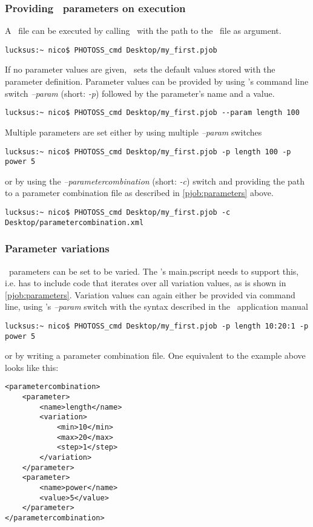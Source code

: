 \subsubsection{Providing \PJOB\ parameters on execution}
A \PJOB\ file can be executed by calling \PHO\ with the path to the \PJOB\ file as argument.
\begin{lstlisting}
lucksus:~ nico$ PHOTOSS_cmd Desktop/my_first.pjob
\end{lstlisting}
If no parameter values are given, \PHO\ sets the default values stored with the parameter definition.
Parameter values can be provided by using \PHO's command line switch \textit{--param} (short: \textit{-p})
followed by the parameter's name and a value.
\begin{lstlisting}
lucksus:~ nico$ PHOTOSS_cmd Desktop/my_first.pjob --param length 100
\end{lstlisting}
Multiple parameters are set either by using multiple \textit{--param} switches
\begin{lstlisting}
lucksus:~ nico$ PHOTOSS_cmd Desktop/my_first.pjob -p length 100 -p power 5
\end{lstlisting}
or by using the \textit{--parametercombination} (short: \textit{-c}) switch and providing the path to a parameter combination file
as described in \ref{pjob:parameters} above.
\begin{lstlisting}
lucksus:~ nico$ PHOTOSS_cmd Desktop/my_first.pjob -c Desktop/parametercombination.xml
\end{lstlisting}

\subsubsection{Parameter variations}
\PJOB\ parameters can be set to be varied.
The \PJOB's main.pscript needs to support this, i.e. has to include code that iterates over all variation values, as is shown in \ref{pjob:parameters}.
Variation values can again either be provided via command line, using \PHO's \textit{--param} switch with the syntax described in the \PHO\ application manual
\begin{lstlisting}
lucksus:~ nico$ PHOTOSS_cmd Desktop/my_first.pjob -p length 10:20:1 -p power 5
\end{lstlisting}
or by writing a parameter combination file.
One equivalent to the example above looks like this:
\lstset{language=XML}
\begin{lstlisting}
<parametercombination>
	<parameter>
		<name>length</name>
		<variation>
			<min>10</min>
			<max>20</max>
			<step>1</step>
		</variation>
	</parameter>
	<parameter>
		<name>power</name>
		<value>5</value>
	</parameter>
</parametercombination>
\end{lstlisting}

